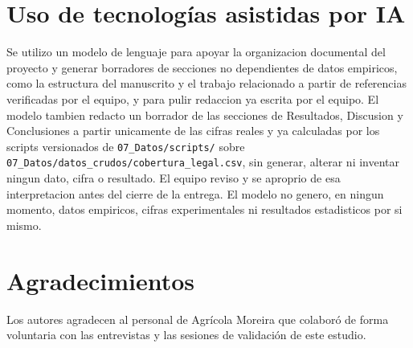 \documentclass[pdflatex,sn-mathphys-num]{sn-jnl}
\begin{document}
\section*{Uso de tecnolog\'ias asistidas por IA}

Se utilizo un modelo de lenguaje para apoyar la organizacion documental del proyecto y generar borradores de secciones no dependientes de datos empiricos, como la estructura del manuscrito y el trabajo relacionado a partir de referencias verificadas por el equipo, y para pulir redaccion ya escrita por el equipo. El modelo tambien redacto un borrador de las secciones de Resultados, Discusion y Conclusiones a partir unicamente de las cifras reales y ya calculadas por los scripts versionados de \texttt{07\_Datos/scripts/} sobre \texttt{07\_Datos/datos\_crudos/cobertura\_legal.csv}, sin generar, alterar ni inventar ningun dato, cifra o resultado. El equipo reviso y se aproprio de esa interpretacion antes del cierre de la entrega. El modelo no genero, en ningun momento, datos empiricos, cifras experimentales ni resultados estadisticos por si mismo.
\section*{Agradecimientos}

Los autores agradecen al personal de Agr\'icola Moreira que colabor\'o de forma voluntaria con las entrevistas y las sesiones de validaci\'on de este estudio.


\end{document}
